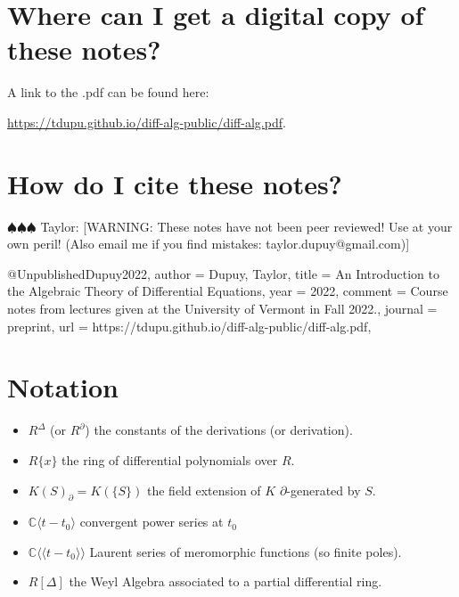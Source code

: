 \documentclass[12pt]{book}
\newcommand{\taylor}[1]{{\color{blue} \sf $\spadesuit\spadesuit\spadesuit$ Taylor: [#1]}}
\numberwithin{equation}{section}
\theoremstyle{definition}
\theoremstyle{remark}
\newcommand{\CC}{\mathbb{C}}
\newcommand{\llangle}{\langle \langle}
\newcommand{\rrangle}{\rangle \rangle}
\begin{document}
\fi


\section*{Where can I get a digital copy of these notes?}
A link to the .pdf can be found here:
\begin{center}
	\url{https://tdupu.github.io/diff-alg-public/diff-alg.pdf}.
\end{center}

\section*{How do I cite these notes?}

\taylor{WARNING: These notes have not been peer reviewed! Use at your own peril! (Also email me if you find mistakes: taylor.dupuy@gmail.com)}


\begin{spverbatim}
@Unpublished{Dupuy2022,
author  = {Dupuy, Taylor},
title   = {An Introduction to the Algebraic Theory of Differential Equations},
year    = {2022},
comment = {Course notes from lectures given at the University of Vermont in Fall 2022.},
journal = {preprint},
url     = {https://tdupu.github.io/diff-alg-public/diff-alg.pdf},
}
\end{spverbatim}


\newpage 
\section{Notation}
\begin{itemize}
	\item $R^{\Delta}$ (or $R^{\partial}$) the constants of the derivations (or derivation). 
	\item $R\lbrace x \rbrace$ the ring of differential polynomials over $R$.
	\item $K(S)_{\partial} = K(\lbrace S \rbrace)$ the field extension of $K$ $\partial$-generated by $S$.
	\item $\CC\langle t-t_0 \rangle$ convergent power series at $t_0$
	\item $\CC\llangle t-t_0\rrangle$ Laurent series of meromorphic functions (so finite poles).
	\item $R[\Delta]$ the Weyl Algebra associated to a partial differential ring.
\end{itemize}
\newpage

\mainmatter

\tableofcontents
\end{document}
